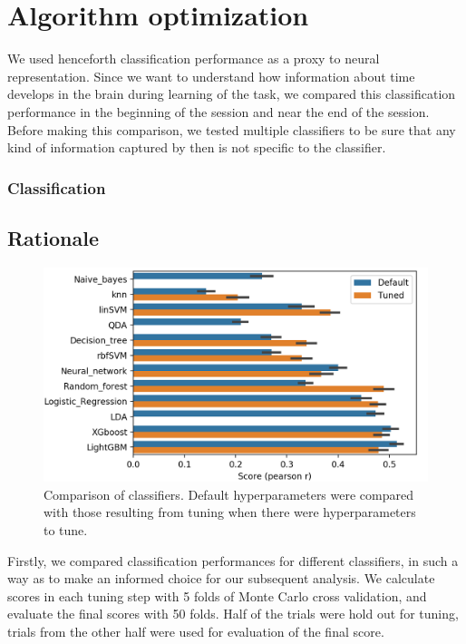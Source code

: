 \chapter{Algorithm optimization}
\label{chap:results}

We used henceforth classification performance as a proxy to neural representation. Since we want to understand how information about time develops in the brain during learning of the task, we compared this classification performance in the beginning of the session and near the end of the session. Before making this comparison, we tested multiple classifiers to be sure that any kind of information captured by then is not specific to the classifier.
\subsection{Classification}

\section{Rationale}
    \begin{figure}
        \centering
        \includegraphics[width=\textwidth]{figures/clf_comparison.png}
        \caption[Comparison of classifiers]{Comparison of classifiers. Default hyperparameters were compared with those resulting from tuning when there were hyperparameters to tune.}
        \label{fig:clf_comparison}
    \end{figure} %
    Firstly, we compared classification performances for different classifiers, in such a way as to make an informed choice for our subsequent analysis. We calculate scores in each tuning step with 5 folds of Monte Carlo cross validation, and evaluate the final scores with 50 folds. Half of the trials were hold out for tuning, trials from the other half were used for evaluation of the final score.
    
